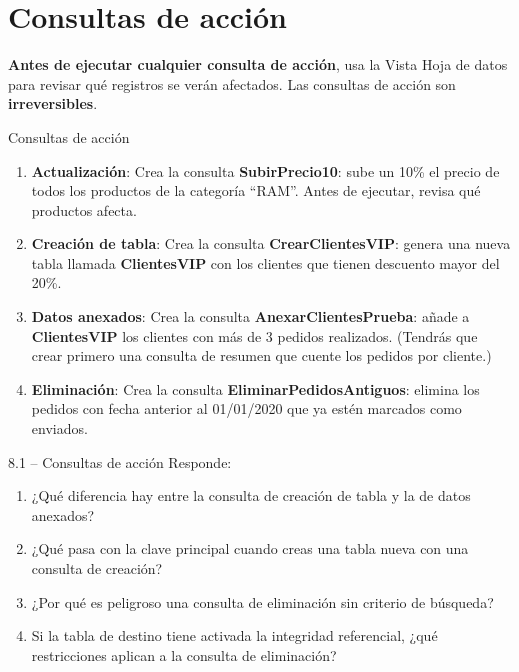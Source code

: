 \documentclass[12pt,a4paper]{article}
\begin{document}
\section{Consultas de acción}

\begin{importante}
\textbf{Antes de ejecutar cualquier consulta de acción}, usa la Vista Hoja de datos para revisar qué registros se verán afectados. Las consultas de acción son \textbf{irreversibles}.
\end{importante}

\begin{practica}{Consultas de acción}
\begin{enumerate}
  \item \textbf{Actualización}: Crea la consulta \textbf{SubirPrecio10}: sube un 10\% el precio de todos los productos de la categoría ``RAM''. Antes de ejecutar, revisa qué productos afecta.

  \item \textbf{Creación de tabla}: Crea la consulta \textbf{CrearClientesVIP}: genera una nueva tabla llamada \textbf{ClientesVIP} con los clientes que tienen descuento mayor del 20\%.

  \item \textbf{Datos anexados}: Crea la consulta \textbf{AnexarClientesPrueba}: añade a \textbf{ClientesVIP} los clientes con más de 3 pedidos realizados. (Tendrás que crear primero una consulta de resumen que cuente los pedidos por cliente.)

  \item \textbf{Eliminación}: Crea la consulta \textbf{EliminarPedidosAntiguos}: elimina los pedidos con fecha anterior al 01/01/2020 que ya estén marcados como enviados.
\end{enumerate}
\end{practica}

\begin{ejercicio}{8.1 -- Consultas de acción}
Responde:
\begin{enumerate}[label=\alph*)]
  \item ¿Qué diferencia hay entre la consulta de creación de tabla y la de datos anexados?
  \item ¿Qué pasa con la clave principal cuando creas una tabla nueva con una consulta de creación?
  \item ¿Por qué es peligroso una consulta de eliminación sin criterio de búsqueda?
  \item Si la tabla de destino tiene activada la integridad referencial, ¿qué restricciones aplican a la consulta de eliminación?
\end{enumerate}
\end{ejercicio}
\end{document}
